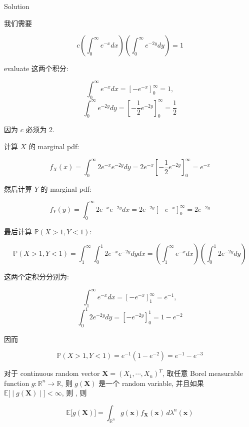 \documentclass{qlnotes-export}
\begin{document}
\begin{qlsolution}{Solution}

我们需要

\[c\left( {\int_{0}^{\infty}e^{- x}dx} \right)\left( {\int_{0}^{\infty}e^{- 2y}dy} \right) = 1\]

evaluate 这两个积分:

\[\int_{0}^{\infty}e^{- x}dx = \left\lbrack {- e^{- x}} \right\rbrack_{0}^{\infty} = 1,\]\[\int_{0}^{\infty}e^{- 2y}dy = \left\lbrack {- \frac{1}{2}e^{- 2y}} \right\rbrack_{0}^{\infty} = \frac{1}{2}\]

因为 \(c\) 必须为 2.

计算 \(X\) 的 marginal pdf:

\[f_{X}(x) = \int_{0}^{\infty}2e^{- x}e^{- 2y}dy = 2e^{- x}\left\lbrack {- \frac{1}{2}e^{- 2y}} \right\rbrack_{0}^{\infty} = e^{- x}\]

然后计算 \(Y\) 的 marginal pdf:

\[f_{Y}(y) = \int_{0}^{\infty}2e^{- x}e^{- 2y}dx = 2e^{- 2y}\left\lbrack {- e^{- x}} \right\rbrack_{0}^{\infty} = 2e^{- 2y}\]

最后计算 \({\mathbb{P}}(X > 1,Y < 1)\):

\[{\mathbb{P}}(X > 1,Y < 1) = \int_{1}^{\infty}\int_{0}^{1}2e^{- x}e^{- 2y}dydx = \left( {\int_{1}^{\infty}e^{- x}dx} \right)\left( {\int_{0}^{1}2e^{- 2y}dy} \right)\]

这两个定积分分别为:

\[\int_{1}^{\infty}e^{- x}dx = \left\lbrack {- e^{- x}} \right\rbrack_{1}^{\infty} = e^{- 1},\]\[\int_{0}^{1}2e^{- 2y}dy = \left\lbrack {- e^{- 2y}} \right\rbrack_{0}^{1} = 1 - e^{- 2}\]

因而

\[{\mathbb{P}}(X > 1,Y < 1) = e^{- 1}(1 - e^{- 2}) = e^{- 1} - e^{- 3}\]

\end{qlsolution}

\begin{theorem}\label{thm-03-joint-conditional-distribution-theorem-001}

对于 continuous random vector \(\mathbf{X} = (X_{1},\cdots,X_{n})^{T}\), 取任意 Borel measurable function \(g:{\mathbb{R}}^{n}\rightarrow{\mathbb{R}}\), 则 \(g(\mathbf{X})\) 是一个 random variable, 并且如果 \(\left. {\mathbb{E}}\lbrack \middle| g(\mathbf{X}) \middle| \rbrack < \infty \right.\), 则 , 则

\[{\mathbb{E}}\lbrack g(\mathbf{X})\rbrack = \int_{{\mathbb{R}}^{n}}g(\mathbf{x})f_{\mathbf{X}}(\mathbf{x})\, d\lambda^{n}(\mathbf{x})\]

\end{theorem}
\end{document}
